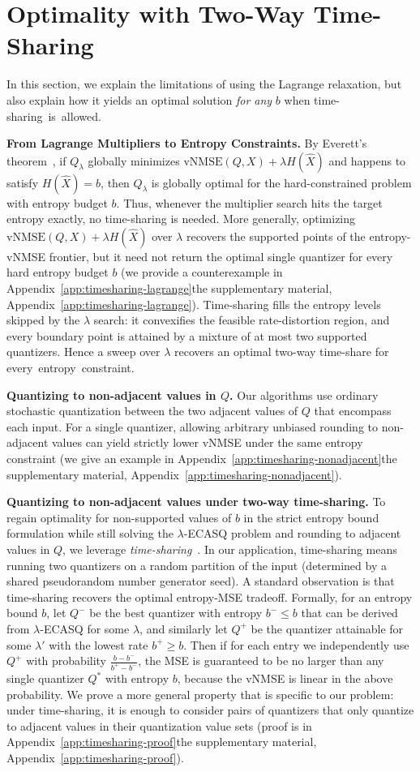 \documentclass[11pt,letterpaper]{article}
\newcommand{\vnmse}{\mathrm{vNMSE}}
\newcommand{\appendixlocation}[1]{\ifarxiv Appendix~\ref{#1}\else the supplementary material, Appendix~\ref{#1}\fi}
\begin{document}
{\ifarxiv
\else
\fi
\section{Optimality with Two-Way Time-Sharing}\label{sec:discussion}
In this section, we explain the limitations of using the Lagrange relaxation, but also explain how it yields an optimal solution \textit{for any} $b$ when \mbox{time-sharing is allowed.}

\textbf{From Lagrange Multipliers to Entropy Constraints.}
By Everett's theorem~\cite{everett1963generalized}, if $Q_\lambda$ globally
minimizes $\vnmse(Q,X)+\lambda H(\widehat X)$ and happens to satisfy
$H(\widehat X)=b$, then $Q_\lambda$ is globally optimal for the hard-constrained
problem with entropy budget $b$. Thus, whenever the multiplier search hits the
target entropy exactly, no time-sharing is needed. More generally, optimizing
$\vnmse(Q,X)+\lambda H(\widehat X)$ over $\lambda$ recovers the supported points
of the entropy-vNMSE frontier, but it need not return the optimal single
quantizer for every hard entropy budget $b$ (we provide a counterexample in
\appendixlocation{app:timesharing-lagrange}). Time-sharing
fills the entropy levels skipped by the $\lambda$ search: it convexifies the feasible
rate-distortion region, and every boundary point is attained by a mixture of at
most two supported quantizers. Hence a sweep over $\lambda$ recovers an optimal
two-way time-share for \mbox{every entropy constraint.}

\textbf{Quantizing to non-adjacent values in $Q$.}
Our algorithms use ordinary stochastic quantization between the two adjacent
values of $Q$ that encompass each input. For a single quantizer, allowing arbitrary unbiased rounding to non-adjacent values can yield strictly lower vNMSE under the same entropy constraint (we give an example in \appendixlocation{app:timesharing-nonadjacent}).

\textbf{Quantizing to non-adjacent values under two-way time-sharing.}
To regain optimality for non-supported values of $b$ in the strict entropy bound formulation while still solving the $\lambda$-ECASQ problem and rounding to adjacent values in $Q$, we leverage \textit{time-sharing}~\cite{chou1989entropy}. In our application, time-sharing means running two quantizers on a random partition of the input (determined by a shared pseudorandom number generator seed). 
A standard observation is that time-sharing recovers the optimal entropy-MSE tradeoff. Formally, for an entropy bound $b$, let $Q^-$ be the best quantizer with entropy $b^-\le b$ that can be derived from $\lambda$-ECASQ for some $\lambda$, and similarly let  $Q^+$ be the quantizer attainable for some $\lambda'$ with the lowest rate $b^+\ge b$.
Then if for each entry we independently use $Q^+$ with probability $\frac{b - b^-}{b^+-b^-}$, the MSE is guaranteed to be no larger than any single quantizer $Q^*$ with entropy $b$, because the vNMSE is linear in the above probability.
We prove a more general property that is specific to our problem: under time-sharing, it is enough to consider pairs of quantizers that only quantize to adjacent values in their quantization value sets (proof is in \appendixlocation{app:timesharing-proof}).

}
\end{document}
